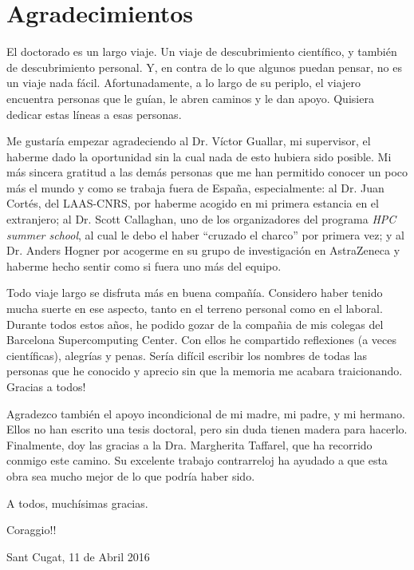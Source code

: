\chapter*{Agradecimientos}%
\thispagestyle{empty}%

El doctorado es un largo viaje. Un viaje de descubrimiento cient\'ifico, y tambi\'en de descubrimiento personal. Y, en contra de lo que algunos puedan pensar, no es un viaje nada f\'acil. Afortunadamente, a lo largo de su periplo, el viajero encuentra personas que le gu\'ian, le abren caminos y le dan apoyo. Quisiera dedicar estas l\'ineas a esas personas.

Me gustar\'ia empezar agradeciendo al Dr. V\'ictor Guallar, mi supervisor, el haberme dado la oportunidad sin la cual nada de esto hubiera sido posible. Mi m\'as sincera gratitud a las dem\'as personas que me han permitido conocer un poco m\'as el mundo y como se trabaja fuera de Espa\~na, especialmente: al Dr. Juan Cort\'es, del LAAS-CNRS, por haberme acogido en mi primera estancia en el extranjero; al Dr. Scott Callaghan, uno de los organizadores del programa \textit{HPC summer school}, al cual le debo el haber ``cruzado el charco'' por primera vez; y al Dr. Anders Hogner por acogerme en su grupo de investigaci\'on en AstraZeneca y haberme hecho sentir como si fuera uno m\'as del equipo.   


Todo viaje largo se disfruta m\'as en buena compa\~n\'ia. Considero haber tenido mucha suerte en ese aspecto, tanto en el terreno personal como en el laboral. Durante todos estos a\~nos, he podido gozar de la compa\~nia de mis colegas del Barcelona Supercomputing Center. Con ellos he compartido reflexiones (a veces cient\'ificas), alegr\'ias y penas. Ser\'ia dif\'icil escribir los nombres de todas las personas que he conocido y aprecio sin que la memoria me acabara traicionando. Gracias a todos! 


Agradezco tambi\'en el apoyo incondicional de mi madre, mi padre, y mi hermano. Ellos no han escrito una tesis doctoral, pero sin duda tienen madera para hacerlo. Finalmente, doy las gracias a la Dra. Margherita Taffarel, que ha recorrido conmigo este camino. Su excelente trabajo contrarreloj ha ayudado a que esta obra sea mucho mejor de lo que podr\'ia haber sido.

A todos, much\'isimas gracias.

Coraggio!!

\begin{flushright} 
Sant Cugat, 11 de Abril 2016
\end{flushright} 


